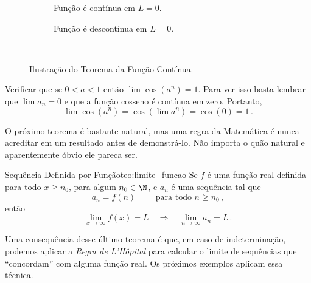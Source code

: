 \begin{figure}[h]
  \centering
  \begin{subfigure}[b]{0.5\linewidth}
    \centering
    
    \caption{Função é contínua em $L=0$.}
    \label{fig:teorema_funcao_continua_1}
  \end{subfigure}%
  \begin{subfigure}[b]{0.5\linewidth}
    \centering
    
    \caption{Função é descontínua em $L=0$.}
    \label{fig:teorema_funcao_continua_2}
  \end{subfigure}\\
  \caption{Ilustração do Teorema da Função Contínua.}
  \label{fig:teorema_funcao_continua}
\end{figure}

\begin{example}
  Verificar que se $0<a<1$ então \(\lim\cos(a^n)=1\).
  \solution
  Para ver isso basta lembrar que $\lim a_n=0$
  e que a função cosseno é contínua em zero.
  Portanto,
  \[
    \lim\cos(a^n) = \cos\left(\lim a^n\right) = \cos(0) = 1 \,.
  \]
\end{example}

O próximo teorema é bastante natural, mas uma regra da Matemática é nunca
acreditar em um resultado antes de demonstrá-lo. Não importa o quão natural e
aparentemente óbvio ele pareca ser.

\begin{teorema}{Sequência Definida por Função}{teo:limite_funcao}
  Se $f$ é uma função real definida para todo $x\geq n_0$, para algum $n_0\in \N$,
  e $a_n$ é uma sequência tal que
  \[
    a_n = f(n) \qquad \text{ para todo } n \geq n_0    \,,
  \]
  então
  \[
    \lim_{x\to\infty}f(x)=L
    \quad \Rightarrow \quad
    \lim_{n\to \infty} a_n=L \,.
  \]
\end{teorema}

Uma consequência desse último teorema é que, em caso de indeterminação,
podemos aplicar a \emph{Regra de L'Hôpital} para
calcular o limite de sequências que ``concordam'' com alguma função real.
Os próximos exemplos aplicam essa técnica.

